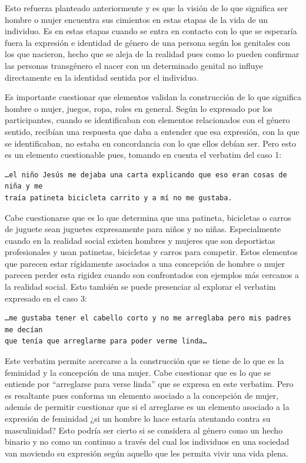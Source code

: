 Esto refuerza planteado anteriormente y es que la visión de lo que
significa ser hombre o mujer encuentra sus cimientos en estas etapas de la vida
de un individuo. Es en estas etapas cuando se entra en contacto con lo que se
esperaría fuera la expresión e identidad de género de una persona según los
genitales con los que nacieron, hecho que se aleja de la realidad pues como lo
pueden confirmar las personas transgénero el nacer con un determinado genital no
influye directamente en la identidad sentida por el individuo.

Es importante cuestionar que elementos validan la construcción de lo que
significa hombre o mujer, juegos, ropa, roles en general. Según lo expresado por
los participantes, cuando se identificaban con elementos relacionados con el
género sentido, recibían una respuesta que daba a entender que esa expresión,
con la que se identificaban, no estaba en concordancia con lo que ellos debían
ser. Pero esto es un elemento cuestionable pues, tomando en cuenta el verbatim
del caso 1:

\begin{verbatim}
…el niño Jesús me dejaba una carta explicando que eso eran cosas de niña y me
traía patineta bicicleta carrito y a mí no me gustaba.
\end{verbatim}

Cabe cuestionarse que es lo que determina que una patineta, bicicletas o carros
de juguete sean juguetes expresamente para niños y no niñas. Especialmente
cuando en la realidad social existen hombres y mujeres que son deportistas
profesionales y usan patinetas, bicicletas y carros para competir. Estos
elementos que parecen estar rígidamente asociados a una concepción de hombre o
mujer parecen perder esta rigidez cuando son confrontados con ejemplos más
cercanos a la realidad social. Esto también se puede presenciar al explorar el
verbatim expresado en el caso 3:

\begin{verbatim}
…me gustaba tener el cabello corto y no me arreglaba pero mis padres me decían
que tenía que arreglarme para poder verme linda…
\end{verbatim}

Este verbatim permite acercarse a la construcción que se tiene de lo que es la
feminidad y la concepción de una mujer. Cabe cuestionar que es lo que se
entiende por “arreglarse para verse linda” que se expresa en este verbatim. Pero
es resaltante pues conforma un elemento asociado a la concepción de mujer,
además de permitir cuestionar que si el arreglarse es un elemento asociado a la
expresión de feminidad ¿si un hombre lo hace estaría atentando contra su
masculinidad? Esto podría ser cierto si se considera al género como un hecho
binario y no como un continuo a través del cual los individuos en una sociedad
van moviendo su expresión según aquello que les permita vivir una vida plena.

